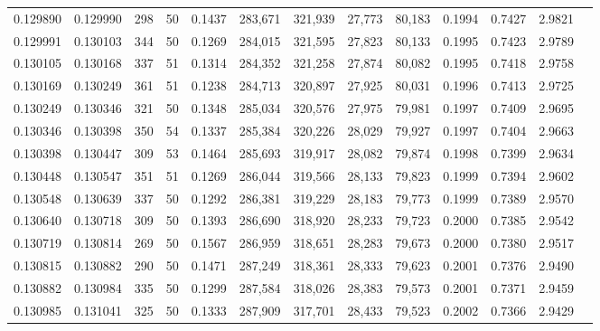 \begin{tabular}{rrrrrrrrrrrrr}
0.129890 & 0.129990 &   298 &  50 &                                     0.1437 & 283,671 & 321,939 &  27,773 &  80,183 & 0.1994 & 0.7427 & 2.9821 \\
0.129991 & 0.130103 &   344 &  50 &                                     0.1269 & 284,015 & 321,595 &  27,823 &  80,133 & 0.1995 & 0.7423 & 2.9789 \\
0.130105 & 0.130168 &   337 &  51 &                                     0.1314 & 284,352 & 321,258 &  27,874 &  80,082 & 0.1995 & 0.7418 & 2.9758 \\
0.130169 & 0.130249 &   361 &  51 &                                     0.1238 & 284,713 & 320,897 &  27,925 &  80,031 & 0.1996 & 0.7413 & 2.9725 \\
0.130249 & 0.130346 &   321 &  50 &                                     0.1348 & 285,034 & 320,576 &  27,975 &  79,981 & 0.1997 & 0.7409 & 2.9695 \\
0.130346 & 0.130398 &   350 &  54 &                                     0.1337 & 285,384 & 320,226 &  28,029 &  79,927 & 0.1997 & 0.7404 & 2.9663 \\
0.130398 & 0.130447 &   309 &  53 &                                     0.1464 & 285,693 & 319,917 &  28,082 &  79,874 & 0.1998 & 0.7399 & 2.9634 \\
0.130448 & 0.130547 &   351 &  51 &                                     0.1269 & 286,044 & 319,566 &  28,133 &  79,823 & 0.1999 & 0.7394 & 2.9602 \\
0.130548 & 0.130639 &   337 &  50 &                                     0.1292 & 286,381 & 319,229 &  28,183 &  79,773 & 0.1999 & 0.7389 & 2.9570 \\
0.130640 & 0.130718 &   309 &  50 &                                     0.1393 & 286,690 & 318,920 &  28,233 &  79,723 & 0.2000 & 0.7385 & 2.9542 \\
0.130719 & 0.130814 &   269 &  50 &                                     0.1567 & 286,959 & 318,651 &  28,283 &  79,673 & 0.2000 & 0.7380 & 2.9517 \\
0.130815 & 0.130882 &   290 &  50 &                                     0.1471 & 287,249 & 318,361 &  28,333 &  79,623 & 0.2001 & 0.7376 & 2.9490 \\
0.130882 & 0.130984 &   335 &  50 &                                     0.1299 & 287,584 & 318,026 &  28,383 &  79,573 & 0.2001 & 0.7371 & 2.9459 \\
0.130985 & 0.131041 &   325 &  50 &                                     0.1333 & 287,909 & 317,701 &  28,433 &  79,523 & 0.2002 & 0.7366 & 2.9429 \\

\end{tabular}

